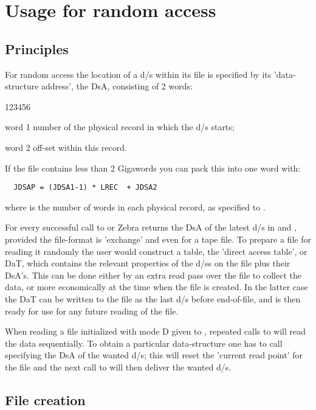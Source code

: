 \section{Usage for random access}
\label{sec:random-access}

\subsection*{Principles}

For random access the location of a d/s within its file is specified
by its 'data-structure address', the DsA, consisting of 2 words:

\begin{DLtt}{123456}
\item[word 1] number of the physical record in which the d/s starts;
\item[word 2] off-set within this record.
\end{DLtt}

If the file contains less than 2 Gigawords you can pack this into
one word with:

\begin{verbatim}
  JDSAP = (JDSA1-1) * LREC  + JDSA2
\end{verbatim}
%
where  is the number of words in each physical record, as specified
to .

For every successful call to  or  Zebra returns the DsA
of the latest d/s in  and ,
provided the file-format is 'exchange' and even for a tape file.
To prepare a file for reading it randomly the user would construct
a table, the 'direct access table', or DaT, which contains the
relevant properties of the d/ss on the file plus their DsA's.
This can be done either by an extra read pass over the file
to collect the data, or more economically at the time when the
file is created.
In the latter case the DaT can be written to the file as
the last d/s before end-of-file,
and is then ready for use for any future reading of the file.

When reading a file initialized with mode D given to ,
repeated calls to  will read the data sequentially.
To obtain a particular data-structure one has to call  specifying
the DsA of the wanted d/s; this will reset the 'current read point'
for the file and the next call to  will then deliver the wanted d/s.

\subsection*{File creation}

